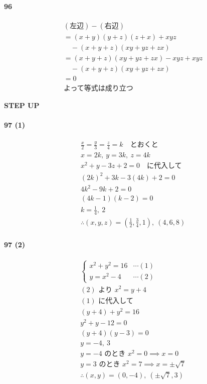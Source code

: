 \documentclass[fleqn,a4j,dvipdfmx,uplatex,twocolumn]{jsarticle}
\begin{document}
\paragraph{96}
\begin{align*}
  &(\text{左辺})-(\text{右辺}) \\
  &= (x+y)(y+z)(z+x)+xyz \\
  &\quad -(x+y+z)(xy+yz+zx) \\
  &= (x+y+z)(xy+yz+zx)-xyz+xyz \\
  &\quad -(x+y+z)(xy+yz+zx) \\
  &= 0 \\
  &\text{よって等式は成り立つ}
\end{align*}

\clearpage
\begin{center}
  \textbf{STEP UP}\\
\end{center}

\paragraph{97 (1)}
\begin{align*}
  &\frac{x}{2}=\frac{y}{3}=\frac{z}{4}=k \quad \text{とおくと} \\
  &x=2k, \ y=3k, \ z=4k \\
  &x^{2}+y-3z+2=0 \quad \text{に代入して} \\
  &(2k)^{2}+3k-3(4k)+2=0 \\
  &4k^{2}-9k+2=0 \\
  &(4k-1)(k-2)=0 \\
  &k=\frac{1}{4}, \ 2 \\
  &\therefore (x, y, z) = \left(\frac{1}{2}, \frac{3}{4}, 1\right), \ (4, 6, 8)
\end{align*}

\paragraph{97 (2)}
\begin{align*}
  &\begin{cases} x^{2}+y^{2}=16 & \cdots (1) \\ y=x^{2}-4 & \cdots (2) \end{cases} \\
  &(2) \text{ より } x^{2}=y+4 \\
  &(1) \text{ に代入して} \\
  &(y+4)+y^{2}=16 \\
  &y^{2}+y-12=0 \\
  &(y+4)(y-3)=0 \\
  &y=-4, \ 3 \\
  &y=-4 \text{ のとき } x^{2}=0 \implies x=0 \\
  &y=3 \text{ のとき } x^{2}=7 \implies x=\pm\sqrt{7} \\
  &\therefore (x, y) = (0, -4), \ (\pm\sqrt{7}, 3)
\end{align*}
\end{document}

